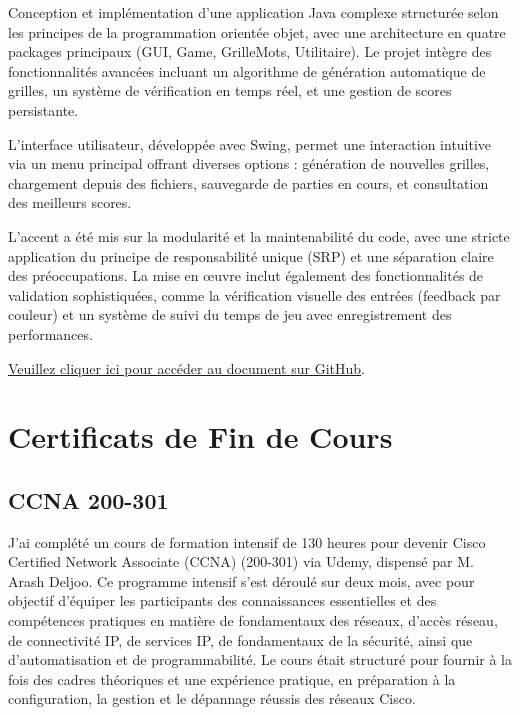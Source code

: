 \documentclass{article}
\begin{document}
    Conception et implémentation d'une application Java complexe structurée selon les principes de la programmation orientée objet, avec une architecture en quatre packages principaux (GUI, Game, GrilleMots, Utilitaire). Le projet intègre des fonctionnalités avancées incluant un algorithme de génération automatique de grilles, un système de vérification en temps réel, et une gestion de scores persistante.

    L'interface utilisateur, développée avec Swing, permet une interaction intuitive via un menu principal offrant diverses options : génération de nouvelles grilles, chargement depuis des fichiers, sauvegarde de parties en cours, et consultation des meilleurs scores.

    L'accent a été mis sur la modularité et la maintenabilité du code, avec une stricte application du principe de responsabilité unique (SRP) et une séparation claire des préoccupations. La mise en œuvre inclut également des fonctionnalités de validation sophistiquées, comme la vérification visuelle des entrées (feedback par couleur) et un système de suivi du temps de jeu avec enregistrement des performances.
    \newline
    \newline
    \newline

    \href{https://github.com/jafarizadeh/CV---lettre/tree/a64fa195620766a9cf39fd42a2fd963779d13f6f/Document/Projets/Co-author}{Veuillez cliquer ici pour accéder au document sur GitHub}.
    
   
    

    

    \newpage


\section{Certificats de Fin de Cours}

    \subsection{CCNA 200-301}

    J'ai complété un cours de formation intensif de 130 heures pour devenir Cisco Certified Network Associate (CCNA) (200-301) via Udemy, dispensé par M. Arash Deljoo. Ce programme intensif s'est déroulé sur deux mois, avec pour objectif d'équiper les participants des connaissances essentielles et des compétences pratiques en matière de fondamentaux des réseaux, d'accès réseau, de connectivité IP, de services IP, de fondamentaux de la sécurité, ainsi que d'automatisation et de programmabilité. Le cours était structuré pour fournir à la fois des cadres théoriques et une expérience pratique, en préparation à la configuration, la gestion et le dépannage réussis des réseaux Cisco.
\end{document}
